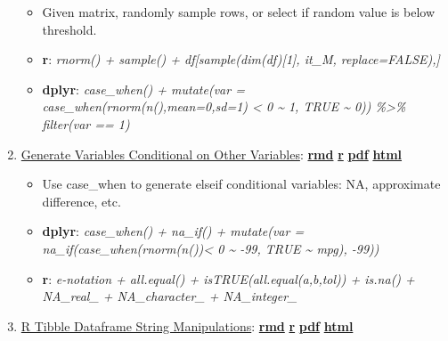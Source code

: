 \documentclass[
]{book}
\providecommand{\tightlist}{%
  \setlength{\itemsep}{0pt}\setlength{\parskip}{0pt}}
\begin{document}
\begin{enumerate}
  \begin{itemize}
  \tightlist
  \item
    Given matrix, randomly sample rows, or select if random value is below threshold.
  \item
    \textbf{r}: \emph{rnorm() + sample() + df{[}sample(dim(df){[}1{]}, it\_M, replace=FALSE),{]}}
  \item
    \textbf{dplyr}: \emph{case\_when() + mutate(var = case\_when(rnorm(n(),mean=0,sd=1) \textless{} 0 \textasciitilde{} 1, TRUE \textasciitilde{} 0)) \%\textgreater\% filter(var == 1)}
  \end{itemize}
\item
  \href{https://fanwangecon.github.io/R4Econ/amto/tibble/htmlpdfr/fs_tib_na.html}{Generate Variables Conditional on Other Variables}: \href{https://github.com/FanWangEcon/R4Econ/blob/master/amto/tibble//fs_tib_na.Rmd}{\textbf{rmd}} \textbar{} \href{https://github.com/FanWangEcon/R4Econ/blob/master/amto/tibble/htmlpdfr/fs_tib_na.R}{\textbf{r}} \textbar{} \href{https://github.com/FanWangEcon/R4Econ/blob/master/amto/tibble/htmlpdfr/fs_tib_na.pdf}{\textbf{pdf}} \textbar{} \href{https://fanwangecon.github.io/R4Econ/amto/tibble/htmlpdfr/fs_tib_na.html}{\textbf{html}}

  \begin{itemize}
  \tightlist
  \item
    Use case\_when to generate elseif conditional variables: NA, approximate difference, etc.
  \item
    \textbf{dplyr}: \emph{case\_when() + na\_if() + mutate(var = na\_if(case\_when(rnorm(n())\textless{} 0 \textasciitilde{} -99, TRUE \textasciitilde{} mpg), -99))}
  \item
    \textbf{r}: \emph{e-notation + all.equal() + isTRUE(all.equal(a,b,tol)) + is.na() + NA\_real\_ + NA\_character\_ + NA\_integer\_}
  \end{itemize}
\item
  \href{https://fanwangecon.github.io/R4Econ/amto/tibble/htmlpdfr/fs_tib_string.html}{R Tibble Dataframe String Manipulations}: \href{https://github.com/FanWangEcon/R4Econ/blob/master/amto/tibble//fs_tib_string.Rmd}{\textbf{rmd}} \textbar{} \href{https://github.com/FanWangEcon/R4Econ/blob/master/amto/tibble/htmlpdfr/fs_tib_string.R}{\textbf{r}} \textbar{} \href{https://github.com/FanWangEcon/R4Econ/blob/master/amto/tibble/htmlpdfr/fs_tib_string.pdf}{\textbf{pdf}} \textbar{} \href{https://fanwangecon.github.io/R4Econ/amto/tibble/htmlpdfr/fs_tib_string.html}{\textbf{html}}
\end{enumerate}
\end{document}
